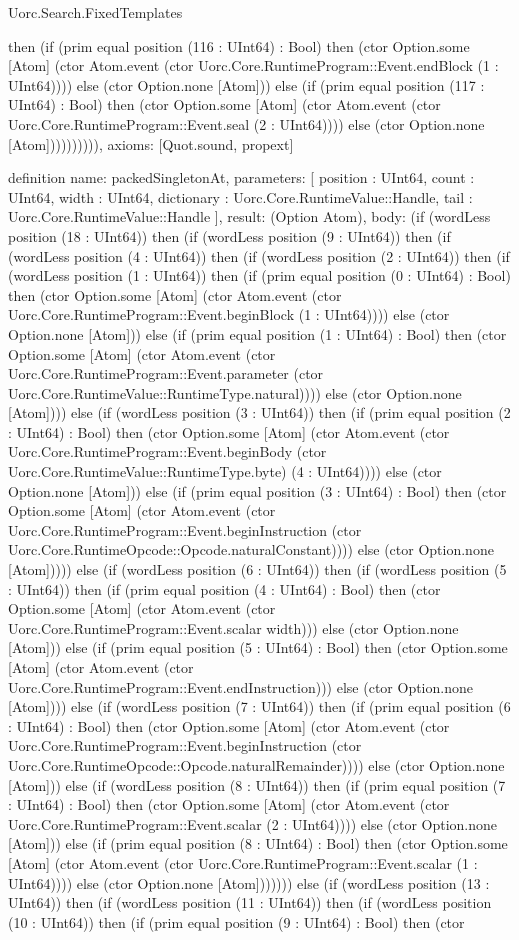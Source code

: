 \begin{lexlean}{Uorc.Search.FixedTemplates}
\begin{semanticmodule}
{then (if (prim equal position (116 : UInt64) : Bool) then (ctor Option.some [Atom] (ctor Atom.event (ctor Uorc.Core.RuntimeProgram::Event.endBlock (1 : UInt64)))) else (ctor Option.none [Atom])) else (if (prim equal position (117 : UInt64) : Bool) then (ctor Option.some [Atom] (ctor Atom.event (ctor Uorc.Core.RuntimeProgram::Event.seal (2 : UInt64)))) else (ctor Option.none [Atom]))))))))),
  axioms: [Quot.sound, propext]
}

definition{
  name: packedSingletonAt,
  parameters: [
    position : UInt64,
    count : UInt64,
    width : UInt64,
    dictionary : Uorc.Core.RuntimeValue::Handle,
    tail : Uorc.Core.RuntimeValue::Handle
  ],
  result: (Option Atom),
  body: (if (wordLess position (18 : UInt64)) then (if (wordLess position (9 : UInt64)) then (if (wordLess position (4 : UInt64)) then (if (wordLess position (2 : UInt64)) then (if (wordLess position (1 : UInt64)) then (if (prim equal position (0 : UInt64) : Bool) then (ctor Option.some [Atom] (ctor Atom.event (ctor Uorc.Core.RuntimeProgram::Event.beginBlock (1 : UInt64)))) else (ctor Option.none [Atom])) else (if (prim equal position (1 : UInt64) : Bool) then (ctor Option.some [Atom] (ctor Atom.event (ctor Uorc.Core.RuntimeProgram::Event.parameter (ctor Uorc.Core.RuntimeValue::RuntimeType.natural)))) else (ctor Option.none [Atom]))) else (if (wordLess position (3 : UInt64)) then (if (prim equal position (2 : UInt64) : Bool) then (ctor Option.some [Atom] (ctor Atom.event (ctor Uorc.Core.RuntimeProgram::Event.beginBody (ctor Uorc.Core.RuntimeValue::RuntimeType.byte) (4 : UInt64)))) else (ctor Option.none [Atom])) else (if (prim equal position (3 : UInt64) : Bool) then (ctor Option.some [Atom] (ctor Atom.event (ctor Uorc.Core.RuntimeProgram::Event.beginInstruction (ctor Uorc.Core.RuntimeOpcode::Opcode.naturalConstant)))) else (ctor Option.none [Atom])))) else (if (wordLess position (6 : UInt64)) then (if (wordLess position (5 : UInt64)) then (if (prim equal position (4 : UInt64) : Bool) then (ctor Option.some [Atom] (ctor Atom.event (ctor Uorc.Core.RuntimeProgram::Event.scalar width))) else (ctor Option.none [Atom])) else (if (prim equal position (5 : UInt64) : Bool) then (ctor Option.some [Atom] (ctor Atom.event (ctor Uorc.Core.RuntimeProgram::Event.endInstruction))) else (ctor Option.none [Atom]))) else (if (wordLess position (7 : UInt64)) then (if (prim equal position (6 : UInt64) : Bool) then (ctor Option.some [Atom] (ctor Atom.event (ctor Uorc.Core.RuntimeProgram::Event.beginInstruction (ctor Uorc.Core.RuntimeOpcode::Opcode.naturalRemainder)))) else (ctor Option.none [Atom])) else (if (wordLess position (8 : UInt64)) then (if (prim equal position (7 : UInt64) : Bool) then (ctor Option.some [Atom] (ctor Atom.event (ctor Uorc.Core.RuntimeProgram::Event.scalar (2 : UInt64)))) else (ctor Option.none [Atom])) else (if (prim equal position (8 : UInt64) : Bool) then (ctor Option.some [Atom] (ctor Atom.event (ctor Uorc.Core.RuntimeProgram::Event.scalar (1 : UInt64)))) else (ctor Option.none [Atom])))))) else (if (wordLess position (13 : UInt64)) then (if (wordLess position (11 : UInt64)) then (if (wordLess position (10 : UInt64)) then (if (prim equal position (9 : UInt64) : Bool) then (ctor }
\end{semanticmodule}
\end{lexlean}
